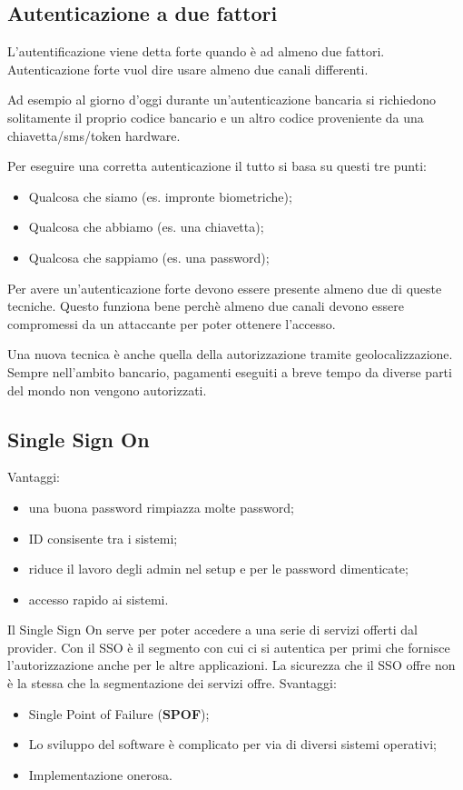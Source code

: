 \subsection{Autenticazione a due fattori}

L'autentificazione viene detta forte quando è ad almeno due fattori.
Autenticazione forte vuol dire usare almeno due canali differenti.

Ad esempio al giorno d'oggi durante un'autenticazione bancaria si richiedono
solitamente il proprio codice bancario e un altro codice proveniente da una
chiavetta/sms/token hardware.

Per eseguire una corretta autenticazione il tutto si basa su questi tre punti:
\begin{itemize}
 \item Qualcosa che siamo (es. impronte biometriche);
 \item Qualcosa che abbiamo (es. una chiavetta);
 \item Qualcosa che sappiamo (es. una password);
\end{itemize}

Per avere un'autenticazione forte devono essere presente almeno due di queste
tecniche. Questo funziona bene perchè almeno due canali devono essere
compromessi da un attaccante per poter ottenere l'accesso.

Una nuova tecnica è anche quella della autorizzazione tramite
geolocalizzazione. Sempre nell'ambito bancario, pagamenti eseguiti a breve
tempo da diverse parti del mondo non vengono autorizzati.

\subsection{Single Sign On}

Vantaggi:
\begin{itemize}
\item una buona password rimpiazza molte password;
\item ID consisente tra i sistemi;
\item riduce il lavoro degli admin nel setup e per le password dimenticate;
\item accesso rapido ai sistemi.
\end{itemize}


Il Single Sign On serve per poter accedere a una serie di servizi offerti dal
provider. Con il SSO è il segmento con cui ci si autentica per primi che
fornisce l'autorizzazione anche per le altre applicazioni.
La sicurezza che il SSO offre non è la stessa che la segmentazione dei servizi
offre.
Svantaggi:
\begin{itemize}
\item Single Point of Failure (\textbf{SPOF});
\item Lo sviluppo del software è complicato per via di diversi sistemi operativi;
\item Implementazione onerosa.
\end{itemize}

